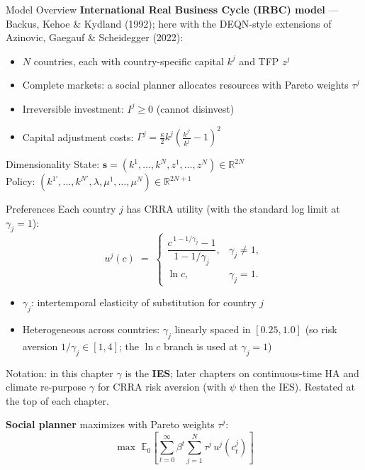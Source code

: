 \documentclass[aspectratio=169,11pt]{beamer}
\newcommand{\emphc}[1]{\textcolor{harvardcrimson}{#1}}
\newcommand{\R}{\mathbb{R}}
\begin{document}
\begin{frame}{Model Overview}
\textbf{International Real Business Cycle (IRBC) model} --- Backus, Kehoe \& Kydland (1992); here with the DEQN-style extensions of Azinovic, Gaegauf \& Scheidegger (2022):

\vspace{0.5em}
\begin{itemize}
    \item $N$ countries, each with \emphc{country-specific capital} $k^j$ and \emphc{TFP} $z^j$
    \item \emphc{Complete markets}: a social planner allocates resources with Pareto weights $\tau^j$
    \item \emphc{Irreversible investment}: $I^j \geq 0$ (cannot disinvest)
    \item \emphc{Capital adjustment costs}: $\Gamma^j = \frac{\kappa}{2} k^j \!\left(\frac{k^{j\prime}}{k^j} - 1\right)^{\!2}$
\end{itemize}

\vspace{0.5em}
\begin{block}{Dimensionality}
State: $\bm{s} = (k^1, \ldots, k^N, z^1, \ldots, z^N) \in \R^{2N}$\\
Policy: $(k^{1\prime}, \ldots, k^{N\prime}, \lambda, \mu^1, \ldots, \mu^N) \in \R^{2N+1}$
\end{block}
\end{frame}

\begin{frame}{Preferences}
\small
Each country $j$ has \emphc{CRRA utility} (with the standard log limit at $\gamma_j = 1$):
\[
u^j(c) \;=\; \begin{cases} \dfrac{c^{\,1 - 1/\gamma_j} - 1}{1 - 1/\gamma_j}, & \gamma_j \neq 1, \\[4pt] \ln c, & \gamma_j = 1. \end{cases}
\]

\vspace{0.2em}
\begin{itemize}\itemsep2pt
    \item $\gamma_j$: intertemporal elasticity of substitution for country $j$
    \item \emphc{Heterogeneous} across countries: $\gamma_j$ linearly spaced in $[0.25, 1.0]$ (so risk aversion $1/\gamma_j \in [1, 4]$; the $\ln c$ branch is used at $\gamma_j = 1$)
\end{itemize}

\vspace{0.2em}
{\scriptsize \emphc{Notation:} in this chapter $\gamma$ is the \textbf{IES}; later chapters on continuous-time HA and climate re-purpose $\gamma$ for CRRA risk aversion (with $\psi$ then the IES). Restated at the top of each chapter.}

\vspace{0.3em}
\textbf{Social planner} maximizes with Pareto weights $\tau^j$:
\[
\max \; \mathbb{E}_0\!\left[\sum_{t=0}^{\infty} \beta^t \sum_{j=1}^{N} \tau^j \, u^j(c_t^j)\right]
\]
\end{frame}
\end{document}
